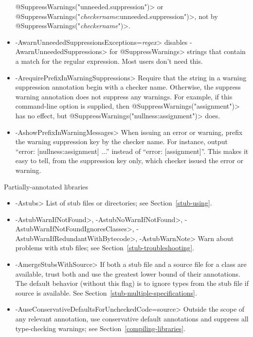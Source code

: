 \begin{itemize}
  \<@SuppressWarnings("unneeded.suppression")>
  or \<@SuppressWarnings("\emph{checkername}:unneeded.suppression")>,
  not by \<@SuppressWarnings("\emph{checkername}")>.
\item \<-AwarnUnneededSuppressionsExceptions=\emph{regex}> disables
  \<-AwarnUnneededSuppressions> for \<@SuppressWarnings> strings that
  contain a match for the regular expression.  Most users don't need this.
\item \<-ArequirePrefixInWarningSuppressions>
  Require that the string in a warning suppression annotation begin with a checker
  name.  Otherwise, the suppress warning annotation does not
  suppress any warnings.  For example, if this command-line option is
  supplied, then \<@SuppressWarnings("assignment")> has no effect, but
  \<@SuppressWarnings("nullness:assignment")> does.
\item \<-AshowPrefixInWarningMessages>
  When issuing an error or warning, prefix the warning suppression key by
  the checker name.  For instance, output ``error: [nullness:assignment]
  ...'' instead of ``error: [assignment]''.  This makes it easy to tell,
  from the suppression key only, which checker issued the error or warning.
\end{itemize}

Partially-annotated libraries
\begin{itemize}


\item \<-Astubs>
  List of stub files or directories; see Section~\ref{stub-using}.

\item
  \<-AstubWarnIfNotFound>,
  \<-AstubNoWarnIfNotFound>,
  \<-AstubWarnIfNotFoundIgnoresClasses>,
  \<-AstubWarnIfRedundantWithBytecode>,
  \<-AstubWarnNote>
  Warn about problems with stub files; see Section~\ref{stub-troubleshooting}.

\item \<-AmergeStubsWithSource>
  If both a stub file and a source file for a class are available, trust
  both and use the greatest lower bound of their annotations. The default
  behavior (without this flag) is to ignore types from the stub file if
  source is available. See Section~\ref{stub-multiple-specifications}.

\item \<-AuseConservativeDefaultsForUncheckedCode=source>
  Outside the scope of any relevant
   annotation, use conservative
  default annotations and suppress all type-checking warnings; see
  Section~\ref{compiling-libraries}.

\end{itemize}

